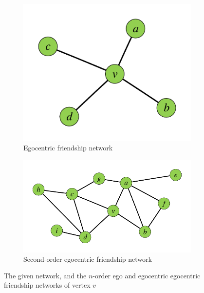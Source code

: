 \begin{figure}[t]
\begin{subfigure}[b]{0.3\textwidth}
                \includegraphics[width=\textwidth]{./images/friends.pdf}
                \caption{Egocentric friendship network}
                \label{fig:1-d}
        \end{subfigure}
        \begin{subfigure}[b]{0.5\textwidth}
                \includegraphics[width=\textwidth]{./images/multi-oder-friends.pdf}
                \caption{Second-order egocentric friendship network}
                \label{fig:1-e}
        \end{subfigure}
        \caption{The given network, and the $n$-order ego and egocentric egocentric friendship networks of vertex $v$}
        \label{fig:1}
\end{figure}

